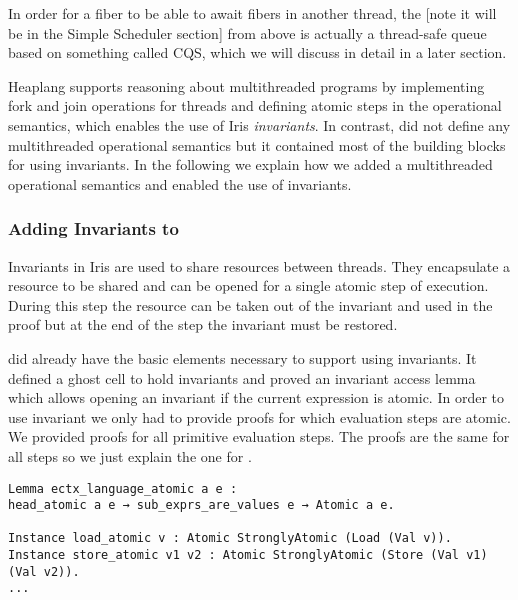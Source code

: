 In order for a fiber to be able to await fibers in another thread, the  [note it will be in the Simple Scheduler section] from above is actually a thread-safe queue based on something called CQS, which we will discuss in detail in a later section.

Heaplang supports reasoning about multithreaded programs by implementing fork and join operations for threads and defining atomic steps in the operational semantics, which enables the use of Iris \emph{invariants}.
In contrast, \hazel{} did not define any multithreaded operational semantics but it contained most of the building blocks for using invariants.
In the following we explain how we added a multithreaded operational semantics and enabled the use of invariants.


\subsubsection*{Adding Invariants to \hazel{}}

Invariants in Iris are used to share resources between threads.
They encapsulate a resource to be shared and can be opened for a single atomic step of execution.
During this step the resource can be taken out of the invariant and used in the proof but at the end of the step the invariant must be restored.

\hazel{} did already have the basic elements necessary to support using invariants.
It defined a ghost cell to hold invariants and proved an invariant access lemma which allows opening an invariant if the current expression is atomic.
In order to use invariant we only had to provide proofs for which evaluation steps are atomic.
We provided proofs for all primitive evaluation steps.
The proofs are the same for all steps so we just explain the one for .

\begin{verbatim}
Lemma ectx_language_atomic a e :
head_atomic a e → sub_exprs_are_values e → Atomic a e.

Instance load_atomic v : Atomic StronglyAtomic (Load (Val v)).
Instance store_atomic v1 v2 : Atomic StronglyAtomic (Store (Val v1) (Val v2)).
...
\end{verbatim}

